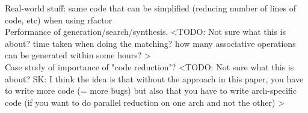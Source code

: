 Real-world stuff: same code that can be simplified (reducing number of lines of code, etc) when using rfactor \\

Performance of generation/search/synthesis. <TODO: Not sure what this is about? time taken when doing the matching? how many associative operations can be generated within some hours? > \\

Case study of importance of "code reduction"? <TODO: Not sure what this is about? SK: I think the idea is that without the approach in this paper, you have to write more code (= more bugs) but also that you have to write arch-specific code (if you want to do parallel reduction on one arch and not the other) > \\ 
